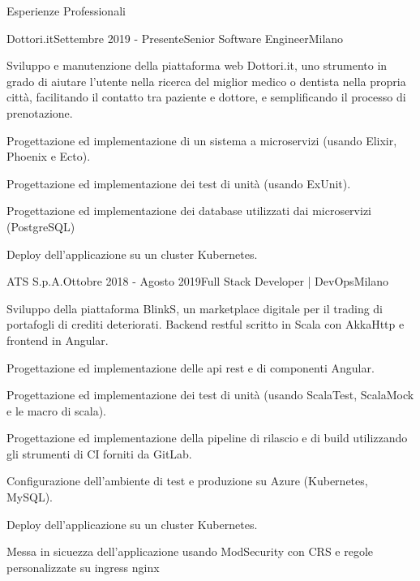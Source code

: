 \documentclass{resume} %
\begin{document}

\begin{rSection}{Esperienze Professionali}

\begin{rSubsection}{Dottori.it}{Settembre 2019 - Presente}{Senior Software Engineer}{Milano}
\item Sviluppo e manutenzione della piattaforma web Dottori.it, uno strumento in grado di aiutare l'utente nella ricerca
del miglior medico o dentista nella propria citt\`a, facilitando il contatto tra paziente e dottore, e semplificando il
processo di prenotazione.
\item Progettazione ed implementazione di un sistema a microservizi (usando Elixir, Phoenix e Ecto).
\item Progettazione ed implementazione dei test di unit\`a (usando ExUnit).
\item Progettazione ed implementazione dei database utilizzati dai microservizi (PostgreSQL)
\item Deploy dell'applicazione su un cluster Kubernetes.
\end{rSubsection}

\begin{rSubsection}{ATS S.p.A.}{Ottobre 2018 - Agosto 2019}{Full Stack Developer | DevOps}{Milano}
\item Sviluppo della piattaforma BlinkS, un marketplace digitale per il trading di portafogli di crediti deteriorati.
Backend restful scritto in Scala con AkkaHttp e frontend in Angular.
\item Progettazione ed implementazione delle api rest e di componenti Angular.
\item Progettazione ed implementazione dei test di unit\`a (usando ScalaTest, ScalaMock e le macro di scala).
\item Progettazione ed implementazione della pipeline di rilascio e di build utilizzando gli strumenti di CI forniti da GitLab.
\item Configurazione dell'ambiente di test e produzione su Azure (Kubernetes, MySQL).
\item Deploy dell'applicazione su un cluster Kubernetes.
\item Messa in sicuezza dell'applicazione usando ModSecurity con CRS e regole personalizzate su ingress nginx
\end{rSubsection}


\end{rSection}
\end{document}
